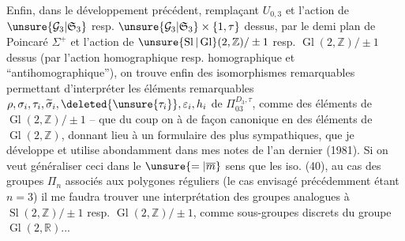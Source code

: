 Enfin, dans le développement précédent, remplaçant $U_{0,3}$ et l'action de $\unsure{\mathcal G_3|\mathfrak S_3}$ resp. $\unsure{\mathcal G_3|\mathfrak S_3}\times\{1,\tau\}$ dessus, par  le demi plan de Poincaré $\Sigma^+$ et l'action de $\unsure{\operatorname{Sl}|\operatorname{Gl}}(2,\mathbb Z)/\pm1$ resp. $\operatorname{Gl}(2,\mathbb Z)/\pm1$ dessus (par l'action homographique resp. homographique et ``antihomographique''), on trouve enfin des isomorphismes remarquables
permettant d'interpréter les éléments remarquables $\rho,\sigma_i,\tau_i,\widetilde\sigma_i,\deleted{\unsure{\tau_i}},\varepsilon_i,h_i$ de $\Pi_{03}^{D_3,\tau}$, comme des éléments de $\operatorname{Gl}(2,\mathbb Z)/\pm1$ -- que du coup on  à  de façon canonique en des éléments de $\operatorname{Gl}(2,\mathbb Z)$, donnant lieu à un formulaire des plus sympathiques, que je développe et utilise abondamment dans mes notes de l'an dernier (1981). Si on veut généraliser ceci dans le $\unsure{=|\overline m}$ sens que les iso. (40), au cas des groupes  $\Pi_n$  associés aux polygones réguliers (le cas envisagé précédemment étant $n=3$) il me faudra trouver une interprétation des groupes analogues à $\operatorname{Sl}(2,\mathbb Z)/\pm1$ resp. $\operatorname{Gl}(2,\mathbb Z)/\pm1$, comme sous-groupes discrets  du groupe $\operatorname{Gl}(2,\mathbb R)$...

